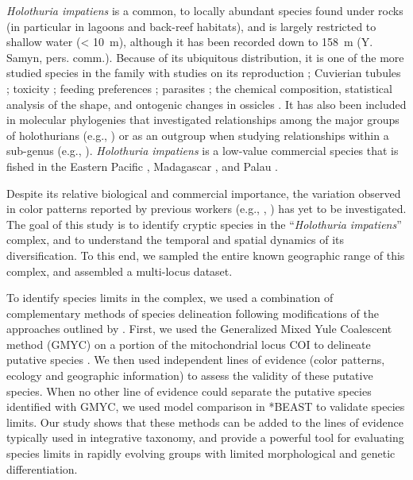 \documentclass[12pt,letterpaper]{article}\usepackage[]{graphicx}\usepackage[]{color}
\begin{document}
\textit{Holothuria impatiens} is a common, to locally abundant species found
under rocks (in particular in lagoons and back-reef habitats), and is largely
restricted to shallow water (< 10~m), although it has been recorded down to
158~m (Y. Samyn, pers. comm.).  Because of its ubiquitous distribution, it is
one of the more studied species in the family with studies on its reproduction
\citep{Harriott1985}; Cuvierian tubules \citep{Flammang2002,Becker+Flammang2010};
toxicity \citep{Bakus1974}; feeding preferences \citep{Roberts1982}; parasites
\citep{Martens1994}; the chemical composition, statistical analysis of the shape,
and ontogenic changes in ossicles \citep{Hampton1958,Hampton1959,Cutress1996}. It
has also been included in molecular phylogenies that investigated relationships
among the major groups of holothurians (e.g., \citep{Lacey2005}) or as an
outgroup when studying relationships within a sub-genus (e.g.,
\citep{Honey-Escandon2012}). \textit{Holothuria impatiens} is a low-value
commercial species that is fished in the Eastern Pacific
\citep{Toral-Granda2008}, Madagascar \citep{Conand2007}, and Palau
\citep{Pakoa2009}.

Despite its relative biological and commercial importance, the variation
observed in color patterns reported by previous workers (e.g.,
\cite[p.178]{Clark1921}, \citep{Rowe+Richmond2004}) has yet to be
investigated. The goal of this study is to identify cryptic species in the
``\textit{Holothuria impatiens}'' complex, and to understand the temporal and
spatial dynamics of its diversification. To this end, we sampled the entire
known geographic range of this complex, and assembled a multi-locus dataset.

To identify species limits in the complex, we used a combination of
complementary methods of species delineation following modifications of the
approaches outlined by \citep{Leache2010,Satler2013,Grummer2014}. First, we used
the Generalized Mixed Yule Coalescent method (GMYC) on a portion of the
mitochondrial locus COI to delineate putative species
\citep{Pons2006,Monaghan2009}. We then used independent lines of evidence (color
patterns, ecology and geographic information) to assess the validity of these
putative species. When no other line of evidence could separate the putative
species identified with GMYC, we used model comparison in *BEAST
\citep{Heled2010,Baele2012} to validate species limits. Our study shows that
these methods can be added to the lines of evidence typically used in
integrative taxonomy, and provide a powerful tool for evaluating species limits
in rapidly evolving groups with limited morphological and genetic
differentiation.
\end{document}
